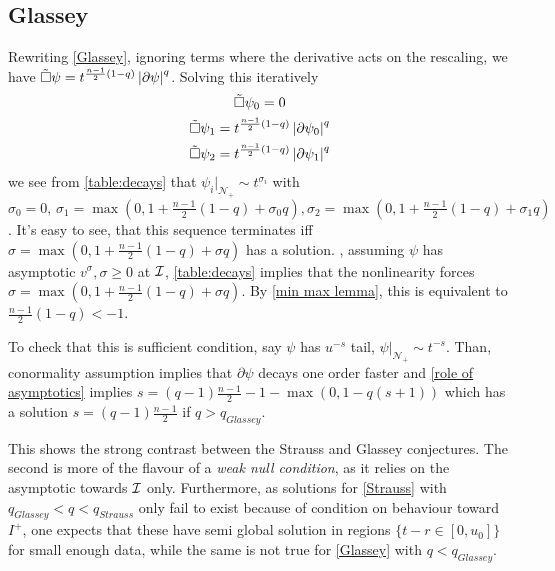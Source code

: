\documentclass[11pt, oneside]{amsart}
\begin{document}
	\subsection{Glassey}
	Rewriting \eqref{Glassey}, ignoring terms where the derivative acts on the rescaling, we have $\tilde{\Box}\psi=t^{\frac{n-1}{2}(1-q)}\left\lvert \partial\psi\right\rvert^q$. Solving this iteratively
	\begin{equation*}
		\begin{gathered}
			\tilde{\Box}\psi_0=0\\
			\tilde{\Box}\psi_1=t^{\frac{n-1}{2}(1-q)}\left\lvert \partial\psi_0\right\rvert^q\\
			\tilde{\Box}\psi_2=t^{\frac{n-1}{2}(1-q)}\left\lvert \partial\psi_1\right\rvert^q
		\end{gathered}
	\end{equation*}
	we see from \cref{table:decays} that $\psi_i|_{\mathcal{N}_+}\sim t^{\sigma_i}$ with $\sigma_0=0,\, \sigma_1=\max(0,1+\frac{n-1}{2}(1-q)+\sigma_0 q),\sigma_2=\max(0,1+\frac{n-1}{2}(1-q)+\sigma_1 q)$. It's easy to see, that this sequence terminates iff $\sigma=\max(0,1+\frac{n-1}{2}(1-q)+\sigma q)$ has a solution.
	, assuming $\psi$ has asymptotic $v^{\sigma},\sigma\geq0$ at $\mathcal{I}$, \cref{table:decays} implies that the nonlinearity forces $\sigma=\max(0,1+\frac{n-1}{2}(1-q)+\sigma q)$. By \cref{min max lemma}, this is equivalent to $\frac{n-1}{2}(1-q)<-1$. 
	
	To check that this is sufficient condition, say $\psi$ has $u^{-s}$ tail, $\psi|_{\mathcal{N}_+}\sim t^{-s}$. Than, conormality assumption implies that $\partial\psi$ decays one order faster and \cref{role of asymptotics} implies $s=(q-1)\frac{n-1}{2}-1-\max(0,1-q(s+1))$ which has a solution $s=(q-1)\frac{n-1}{2}$ if $q>q_{Glassey}$.
	
	\begin{remark}\label{difference between Strauss and Glassey}
		This shows the strong contrast between the Strauss and Glassey conjectures. The second is more of the flavour of a \textit{weak null condition}, as it relies on the asymptotic towards $\mathcal{I}$ only. Furthermore, as solutions for \eqref{Strauss} with $q_{Glassey}<q<q_{Strauss}$ only fail to exist because of condition on behaviour toward $I^+$, one expects that these have semi global solution in regions $\{t-r\in[0,u_0]\}$ for small enough data, while the same is not true for \eqref{Glassey} with $q<q_{Glassey}$.
	\end{remark}
\end{document}
